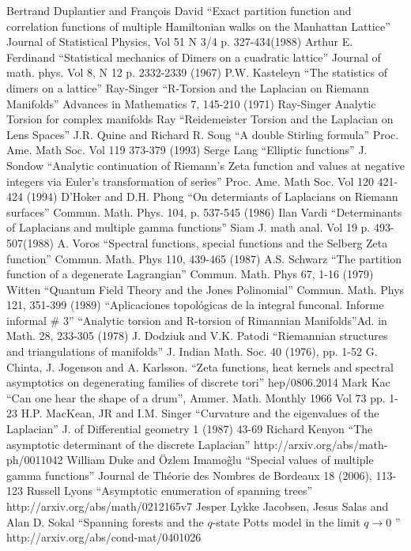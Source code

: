 \documentclass[12pt]{article}
\begin{document}
\begin{thebibliography}{voy}
 Bertrand Duplantier and François David ``Exact partition function and correlation functions of multiple Hamiltonian walks on the Manhattan Lattice'' Journal of Statistical Physics, Vol 51 N 3/4 p. 327-434(1988)
 Arthur E. Ferdinand ``Statistical mechanics of Dimers on a cuadratic lattice'' Journal of math. phys. Vol 8, N 12 p. 2332-2339 (1967)
 P.W. Kasteleyn ``The statistics of dimers on a lattice''
 Ray-Singer ``R-Torsion and the Laplacian on Riemann Manifolds'' Advances in Mathematics 7, 145-210 (1971)
  Ray-Singer Analytic Torsion for complex manifolds
 Ray ``Reidemeister Torsion and the Laplacian on Lens Spaces''
 J.R. Quine and Richard R. Song ``A double Stirling formula'' Proc. Ame. Math Soc. Vol 119 373-379 (1993)
 Serge Lang ``Elliptic functions''
 J. Sondow ``Analytic continuation of Riemann's Zeta function and values at negative integers via Euler's transformation of series'' Proc. Ame. Math Soc. Vol 120 421-424 (1994)
 D'Hoker and D.H. Phong ``On determiants of Laplacians on Riemann surfaces'' Commun. Math. Phys. 104, p. 537-545 (1986)
 Ilan Vardi ``Determinants of Laplacians and multiple gamma functions'' Siam J. math anal. Vol 19 p. 493-507(1988)
 A. Voros ``Spectral functions, special functions and the Selberg Zeta function'' Commun. Math. Phys 110, 439-465 (1987)
 A.S. Schwarz ``The partition function of a degenerate Lagrangian'' Commun. Math. Phys 67, 1-16 (1979)
 Witten ``Quantum Field Theory and the Jones Polinomial'' Commun. Math. Phys 121, 351-399 (1989)
 ``Aplicaciones topológicas de la integral funconal. Informe informal \# 3''
 ``Analytic torsion and R-torsion of Rimannian Manifolds''Ad. in Math. 28, 233-305 (1978)
 J. Dodziuk and V.K. Patodi ``Riemannian structures and triangulations of manifolds'' J. Indian Math. Soc.  40 (1976), pp. 1-52
 G. Chinta, J. Jogenson and A. Karlsson. ``Zeta functions, heat kernels and spectral asymptotics on degenerating families of discrete tori'' hep/0806.2014
 Mark Kac ``Can one hear the shape of a drum'', Ammer. Math. Monthly 1966 Vol 73 pp. 1-23
 H.P. MacKean, JR and I.M. Singer ``Curvature and the eigenvalues of the Laplacian'' J. of Differential geometry 1 (1987) 43-69
 Richard Kenyon ``The asymptotic determinant of the discrete Laplacian'' http://arxiv.org/abs/math-ph/0011042
 William Duke and Özlem Imamo\~glu ``Special values of multiple gamma functions'' Journal de Théorie des Nombres de Bordeaux 18 (2006), 113-123
 Russell Lyons ``Asymptotic enumeration of spanning trees'' http://arxiv.org/abs/math/0212165v7
 Jesper Lykke Jacobsen, Jesus Salas and  Alan D. Sokal ``Spanning forests and the $q$-state Potts model in the limit $q \to 0$ '' http://arxiv.org/abs/cond-mat/0401026
\end{thebibliography}
\end{document}
